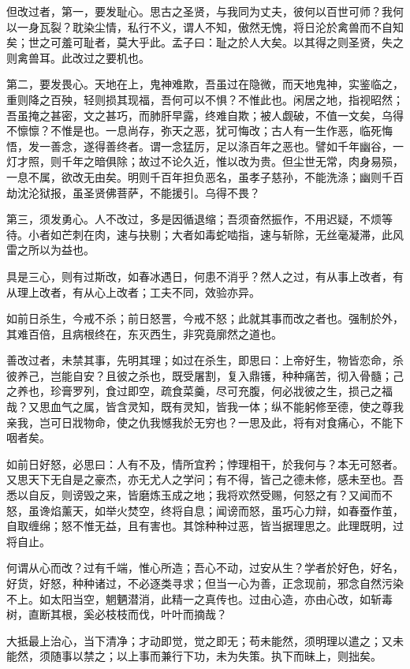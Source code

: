 \documentclass[letterpaper,10pt,english]{sphinxmanual}
\begin{document}
但改过者，第一，要发耻心。思古之圣贤，与我同为丈夫，彼何以百世可师？我何以一身瓦裂？耽染尘情，私行不义，谓人不知，傲然无愧，将日沦於禽兽而不自知矣；世之可羞可耻者，莫大乎此。孟子曰：耻之於人大矣。以其得之则圣贤，失之则禽兽耳。此改过之要机也。

第二，要发畏心。天地在上，鬼神难欺，吾虽过在隐微，而天地鬼神，实鉴临之，重则降之百殃，轻则损其现福，吾何可以不惧？不惟此也。闲居之地，指视昭然；吾虽掩之甚密，文之甚巧，而肺肝早露，终难自欺；被人觑破，不值一文矣，乌得不懔懔？不惟是也。一息尚存，弥天之恶，犹可悔改；古人有一生作恶，临死悔悟，发一善念，遂得善终者。谓一念猛厉，足以涤百年之恶也。譬如千年幽谷，一灯才照，则千年之暗俱除；故过不论久近，惟以改为贵。但尘世无常，肉身易殒，一息不属，欲改无由矣。明则千百年担负恶名，虽孝子慈孙，不能洗涤；幽则千百劫沈沦狱报，虽圣贤佛菩萨，不能援引。乌得不畏？

第三，须发勇心。人不改过，多是因循退缩；吾须奋然振作，不用迟疑，不烦等待。小者如芒刺在肉，速与抉剔；大者如毒蛇啮指，速与斩除，无丝毫凝滞，此风雷之所以为益也。

具是三心，则有过斯改，如春冰遇日，何患不消乎？然人之过，有从事上改者，有从理上改者，有从心上改者；工夫不同，效验亦异。

如前日杀生，今戒不杀；前日怒詈，今戒不怒；此就其事而改之者也。强制於外，其难百倍，且病根终在，东灭西生，非究竟廓然之道也。

善改过者，未禁其事，先明其理；如过在杀生，即思曰：上帝好生，物皆恋命，杀彼养己，岂能自安？且彼之杀也，既受屠割，复入鼎镬，种种痛苦，彻入骨髓；己之养也，珍膏罗列，食过即空，疏食菜羹，尽可充腹，何必戕彼之生，损己之福哉？又思血气之属，皆含灵知，既有灵知，皆我一体；纵不能躬修至德，使之尊我亲我，岂可日戕物命，使之仇我憾我於无穷也？一思及此，将有对食痛心，不能下咽者矣。

如前日好怒，必思曰：人有不及，情所宜矜；悖理相干，於我何与？本无可怒者。又思天下无自是之豪杰，亦无尤人之学问；有不得，皆己之德未修，感未至也。吾悉以自反，则谤毁之来，皆磨炼玉成之地；我将欢然受赐，何怒之有？又闻而不怒，虽谗焰薰天，如举火焚空，终将自息；闻谤而怒，虽巧心力辩，如春蚕作茧，自取缠绵；怒不惟无益，且有害也。其馀种种过恶，皆当据理思之。此理既明，过将自止。

何谓从心而改？过有千端，惟心所造；吾心不动，过安从生？学者於好色，好名，好货，好怒，种种诸过，不必逐类寻求；但当一心为善，正念现前，邪念自然污染不上。如太阳当空，魍魉潜消，此精一之真传也。过由心造，亦由心改，如斩毒树，直断其根，奚必枝枝而伐，叶叶而摘哉？

大抵最上治心，当下清净；才动即觉，觉之即无；苟未能然，须明理以遣之；又未能然，须随事以禁之；以上事而兼行下功，未为失策。执下而昧上，则拙矣。
\end{document}
